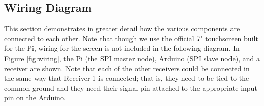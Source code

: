 \documentclass[12pt]{article}
\begin{document}
\subsection{Wiring Diagram}\label{sec:wiring}

This section demonstrates in greater detail how the various components are
connected to each other.
Note that though we use the official 7" touchscreen built for the Pi,
wiring for the screen is not included in the following diagram.
In Figure \ref{fig:wiring}, the Pi (the SPI master node),
Arduino (SPI slave node), and a receiver are shown.
Note that each of the other receivers could be connected in the same way
that Receiver 1 is connected; that is, they need to be tied to the common
ground and they need their signal pin attached to the appropriate input pin
on the Arduino.
\end{document}
